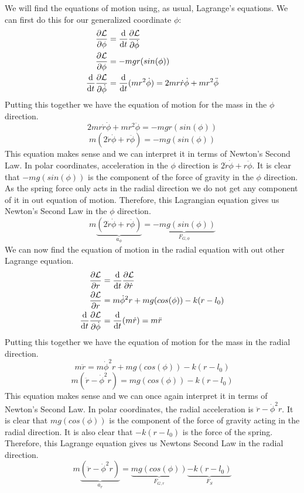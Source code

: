 \documentclass{article}
\begin{document}
We will find the equations of motion using, as usual, Lagrange's equations. We can first do this for our generalized coordinate $\phi$:
\begin{align*}
\pdv{\mathcal{L}}{\phi} &= \odv{}{t} \pdv{\mathcal{L}}{\dot{\phi}}\\
\pdv{\mathcal{L}}{\phi} &= -mgr(sin(\phi))\\
\odv{}{t} \pdv{\mathcal{L}}{\dot{\phi}} &= \odv{}{t}(mr^2\dot{\phi}) = 2mr\dot{r}\dot{\phi} + mr^2\ddot{\phi}      \\
\end{align*}
Putting this together we have the equation of motion for the mass in the $\phi$ direction. 
$$2mr\dot{r}\dot{\phi} + mr^2\ddot{\phi} = -mgr(sin(\phi))$$
$$\boxed{m(2\dot{r}\dot{\phi} + r\ddot{\phi}) = -mg(sin(\phi))}$$
This equation makes sense and we can interpret it in terms of Newton's Second Law. In polar coordinates, acceleration in the $\phi$ direction is $2\dot{r}\dot{\phi} + r\ddot{\phi}$. It is clear that $-mg(sin(\phi))$ is the component of the force of gravity in the $\phi$ direction. As the spring force only acts in the radial direction we do not get any component of it in out equation of motion. Therefore, this Lagrangian equation gives us Newton's Second Law in the $\phi$ direction. 
$$m\underbrace{(2\dot{r}\dot{\phi} + r\ddot{\phi})}_{a_{\phi}} = \underbrace{-mg(sin(\phi))}_{F_{G,\phi}}$$
We can now find the equation of motion in the radial equation with out other Lagrange equation. 
\begin{align*}
\pdv{\mathcal{L}}{r} &= \odv{}{t} \pdv{\mathcal{L}}{\dot{r}}\\
\pdv{\mathcal{L}}{r} &= m\dot{\phi}^2r + mg(cos(\phi))- k(r-l_0)\\
\odv{}{t} \pdv{\mathcal{L}}{\dot{\phi}} &= \odv{}{t}(m\dot{r}) = m\ddot{r}      \\
\end{align*}
Putting this together we have the equation of motion for the mass in the radial direction. 
$$m\ddot{r} = m\dot{\phi}^2r +  mg(cos(\phi))- k(r-l_0) $$
$$\boxed{m (\ddot{r} - \dot{\phi}^2r) =  mg(cos(\phi))- k(r-l_0)}$$
This equation makes sense and we can once again interpret it in terms of Newton's Second Law. In polar coordinates, the radial acceleration is $\ddot{r} - \dot{\phi}^2r$. It is clear that $mg(cos(\phi))$ is the component of the force of gravity acting in the radial direction. It is also clear that $- k(r-l_0)$ is the force of the spring. Therefore, this Lagrange equation gives us Newtons Second Law in the radial direction.
$$m\underbrace{(\ddot{r} - \dot{\phi}^2r)}_{a_r} = \underbrace{mg(cos(\phi))}_{F_{G,r}} \underbrace{-k(r-l_0)}_{F_S}$$
\end{document}
